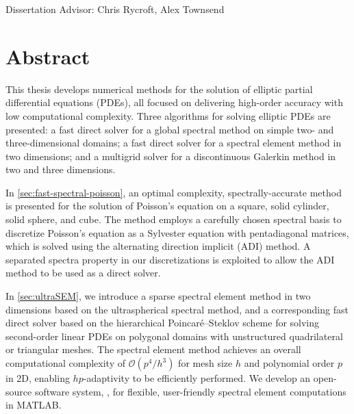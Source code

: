 \begingroup
\let\clearpage\relax
\let\cleardoublepage\relax
\let\cleardoublepage\relax


\begin{center}
Dissertation Advisor: Chris Rycroft, Alex Townsend \hfill
\myName
\end{center}

\vspace{0.9cm}

\begin{center}
{\Large \myTitle}
\end{center}

\vspace{0.9cm}

\chapter*{Abstract}

This thesis develops numerical methods for the solution of elliptic partial differential equations (PDEs), all focused on delivering high-order accuracy with low computational complexity. Three algorithms for solving elliptic PDEs are presented: a fast direct solver for a global spectral method on simple two- and three-dimensional domains; a fast direct solver for a spectral element method in two dimensions; and a multigrid solver for a discontinuous Galerkin method in two and three dimensions.

In \cref{sec:fast-spectral-poisson}, an optimal complexity, spectrally-accurate method is presented for the solution of Poisson's equation on a square, solid cylinder, solid sphere, and cube. The method employs a carefully chosen spectral basis to discretize Poisson's equation as a Sylvester equation with pentadiagonal matrices, which is solved using the alternating direction implicit (ADI) method. A separated spectra property in our discretizations is exploited to allow the ADI method to be used as a direct solver.

In \cref{sec:ultraSEM}, we introduce a sparse spectral element method in two dimensions based on the ultraspherical spectral method, and a corresponding fast direct solver based on the hierarchical Poincar\'{e}--Steklov scheme for solving second-order linear PDEs on polygonal domains with unstructured quadrilateral or triangular meshes. The spectral element method achieves an overall computational complexity of $\mathcal{O}(p^4/h^3)$ for mesh size $h$ and polynomial order $p$ in 2D, enabling $hp$-adaptivity to be efficiently performed. We develop an open-source software system, \ultraSEM, for flexible, user-friendly spectral element computations in MATLAB.

